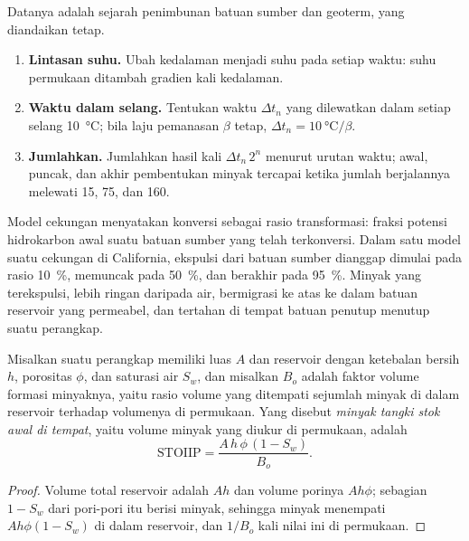 \begin{method}\label{met:b2:energy-geology:tti}
Datanya adalah sejarah penimbunan batuan sumber dan geoterm, yang diandaikan tetap.
\begin{enumerate}
  \item \textbf{Lintasan suhu.} Ubah kedalaman menjadi suhu pada setiap waktu: suhu permukaan
        ditambah gradien kali kedalaman.
  \item \textbf{Waktu dalam selang.} Tentukan waktu $\Delta t_n$ yang dilewatkan dalam setiap selang
        \qty{10}{\celsius}; bila laju pemanasan $\beta$ tetap, $\Delta t_n = \qty{10}{\celsius}/\beta$.
  \item \textbf{Jumlahkan.} Jumlahkan hasil kali $\Delta t_n\,2^n$ menurut urutan waktu; awal, puncak, dan
        akhir pembentukan minyak tercapai ketika jumlah berjalannya melewati 15, 75, dan 160.
\end{enumerate}
\end{method}

Model cekungan menyatakan konversi sebagai rasio transformasi: fraksi potensi hidrokarbon
awal suatu batuan sumber yang telah terkonversi. Dalam satu model suatu cekungan di California,
ekspulsi dari batuan sumber dianggap dimulai pada rasio \qty{10}{\percent}, memuncak pada
\qty{50}{\percent}, dan berakhir pada \qty{95}{\percent}. Minyak yang terekspulsi, lebih ringan daripada air,
bermigrasi ke atas ke dalam batuan reservoir yang permeabel, dan tertahan di tempat batuan penutup menutup suatu perangkap.

\begin{proposition}\label{prop:b2:energy-geology:volumetrics}
Misalkan suatu perangkap memiliki luas $A$ dan reservoir dengan ketebalan bersih $h$, porositas $\phi$, dan saturasi air
$S_w$, dan misalkan $B_o$ adalah faktor volume formasi minyaknya, yaitu rasio volume yang ditempati sejumlah
minyak di dalam reservoir terhadap volumenya di permukaan. Yang disebut \emph{minyak tangki stok awal
di tempat}, yaitu volume minyak yang diukur di permukaan, adalah
\begin{equation}
\mathrm{STOIIP} = \frac{A\,h\,\phi\,(1 - S_w)}{B_o} .
\label{eq:b2:energy-geology:stoiip}
\end{equation}
\end{proposition}

\begin{proof}
Volume total reservoir adalah $Ah$ dan volume porinya $Ah\phi$; sebagian $1 - S_w$ dari
pori-pori itu berisi minyak, sehingga minyak menempati $Ah\phi(1 - S_w)$ di dalam reservoir, dan $1/B_o$ kali nilai ini di
permukaan.
\end{proof}

